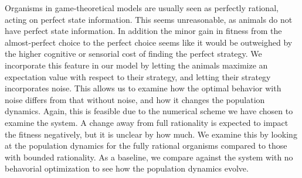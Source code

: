 Organisms in game-theoretical models are usually seen as perfectly rational, acting on perfect state information. This seems unreasonable, as animals do not have perfect state information. In addition the minor gain in fitness from the almost-perfect choice to the perfect choice seems like it would be outweighed by the higher cognitive or sensorial cost of finding the perfect strategy.
 We incorporate this feature in our model by letting the animals maximize an expectation value with respect to their strategy, and letting their strategy incorporates noise. This allows us to examine how the optimal behavior with noise differs from that without noise, and how it changes the population dynamics. Again, this is feasible due to the numerical scheme we have chosen to examine the system. A change away from full rationality is expected to impact the fitness negatively, but it is unclear by how much. We examine this by looking at the population dynamics for the fully rational organisms compared to those with bounded rationality. As a baseline, we compare against the system with no behavorial optimization to see how the population dynamics evolve.












